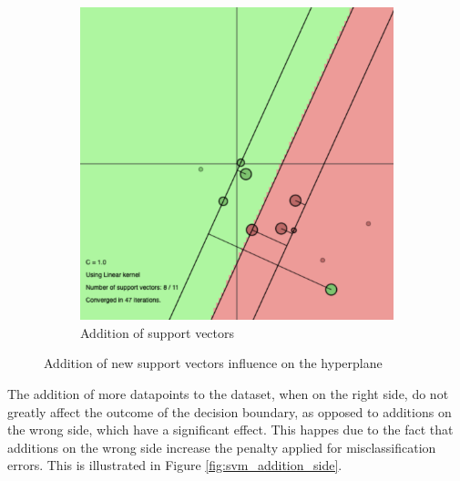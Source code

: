 \documentclass[a4paper, 11pt, one column]{article}
\begin{document}
\begin{figure}[]
\begin{subfigure}{0.4\linewidth}
        \includegraphics[width=\linewidth]{images/sup_imp_1.png}
        \caption{Addition of support vectors}
    \end{subfigure}
    \caption{Addition of new support vectors influence on the hyperplane}
    \label{fig:influence}
\end{figure}

The addition of more datapoints to the dataset, when on the right side, do not greatly affect the outcome of the decision boundary, as opposed to additions on the wrong side, which have a significant effect. This happes due to the fact that additions on the wrong side increase the penalty applied for misclassification errors. This is illustrated in Figure \ref{fig:svm_addition_side}.
\end{document}
